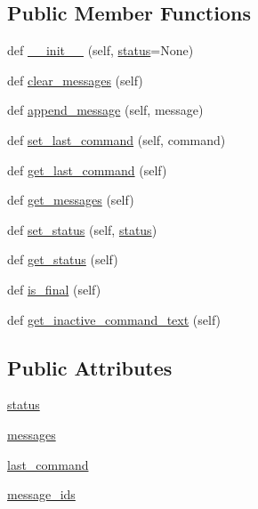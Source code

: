 \subsection*{Public Member Functions}
\begin{DoxyCompactItemize}
\item 
def \hyperlink{classparlai_1_1mturk_1_1core_1_1agents_1_1AssignState_aace503a7d51d513573c41ac25cd6510f}{\+\_\+\+\_\+init\+\_\+\+\_\+} (self, \hyperlink{classparlai_1_1mturk_1_1core_1_1agents_1_1AssignState_a1d77495a7694cc88c937c06d4d4d039e}{status}=None)
\item 
def \hyperlink{classparlai_1_1mturk_1_1core_1_1agents_1_1AssignState_a6a683e69e6ba2fc0db6570a7af70d1c0}{clear\+\_\+messages} (self)
\item 
def \hyperlink{classparlai_1_1mturk_1_1core_1_1agents_1_1AssignState_a655ebb0e19f6a1b66416848bc2abca27}{append\+\_\+message} (self, message)
\item 
def \hyperlink{classparlai_1_1mturk_1_1core_1_1agents_1_1AssignState_a6251191f5a8d16778dc56e21564ede79}{set\+\_\+last\+\_\+command} (self, command)
\item 
def \hyperlink{classparlai_1_1mturk_1_1core_1_1agents_1_1AssignState_a50b030308201e7e8e91292ec2419400b}{get\+\_\+last\+\_\+command} (self)
\item 
def \hyperlink{classparlai_1_1mturk_1_1core_1_1agents_1_1AssignState_a969247ece20ee74e12196bd5b5c448cc}{get\+\_\+messages} (self)
\item 
def \hyperlink{classparlai_1_1mturk_1_1core_1_1agents_1_1AssignState_a7cd23ff37c1c1e0c6d8548f77a8d078c}{set\+\_\+status} (self, \hyperlink{classparlai_1_1mturk_1_1core_1_1agents_1_1AssignState_a1d77495a7694cc88c937c06d4d4d039e}{status})
\item 
def \hyperlink{classparlai_1_1mturk_1_1core_1_1agents_1_1AssignState_a14f5a0cbaf099fb25cfa284a502a8275}{get\+\_\+status} (self)
\item 
def \hyperlink{classparlai_1_1mturk_1_1core_1_1agents_1_1AssignState_a95b2a76b6e8ec7e045542450ee49f971}{is\+\_\+final} (self)
\item 
def \hyperlink{classparlai_1_1mturk_1_1core_1_1agents_1_1AssignState_aeda3adf715e8ed5a39d302792b056960}{get\+\_\+inactive\+\_\+command\+\_\+text} (self)
\end{DoxyCompactItemize}
\subsection*{Public Attributes}
\begin{DoxyCompactItemize}
\item 
\hyperlink{classparlai_1_1mturk_1_1core_1_1agents_1_1AssignState_a1d77495a7694cc88c937c06d4d4d039e}{status}
\item 
\hyperlink{classparlai_1_1mturk_1_1core_1_1agents_1_1AssignState_a8f08edc51460fb9ad6afc26c60e19990}{messages}
\item 
\hyperlink{classparlai_1_1mturk_1_1core_1_1agents_1_1AssignState_a055a267b03cf1ad3aed703ca83b52597}{last\+\_\+command}
\item 
\hyperlink{classparlai_1_1mturk_1_1core_1_1agents_1_1AssignState_a11bf85034efc6e223c6a58a695b022b8}{message\+\_\+ids}
\end{DoxyCompactItemize}
